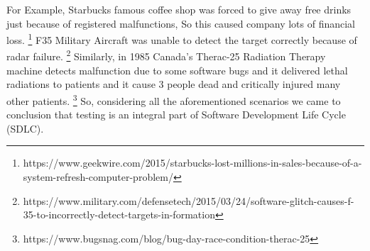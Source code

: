 For Example, Starbucks famous coffee shop was forced to give away free drinks just because of registered malfunctions, So this caused company lots of financial loss. \footnote{https://www.geekwire.com/2015/starbucks-lost-millions-in-sales-because-of-a-system-refresh-computer-problem/} F35 Military Aircraft was unable to detect the target correctly because of radar failure. \footnote{https://www.military.com/defensetech/2015/03/24/software-glitch-causes-f-35-to-incorrectly-detect-targets-in-formation} Similarly, in 1985 Canada's Therac-25 Radiation Therapy machine detects malfunction due to some software bugs and it delivered lethal radiations to patients and it cause 3 people dead and critically injured many other patients. \footnote{https://www.bugsnag.com/blog/bug-day-race-condition-therac-25} So, considering all the aforementioned scenarios we came to conclusion that testing is an integral part of Software Development Life Cycle (SDLC).











